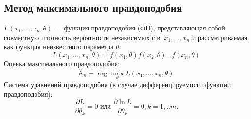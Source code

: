 \subsection{Метод максимального правдоподобия}
\begin{flushleft}
	$L(x_{1},... ,x_{n}, \theta)\,-$  функция правдоподобия (ФП), представляющая собой совместную плотность вероятности независимых с.в. $x_{1}, ... ,x_{n}$ и рассматриваемая как функция неизвестного параметра $\theta$:
	\begin{equation}
		L(x_{1},...,x_{n},\theta) = f(x_{1},\theta)f(x_{2},\theta)...f(x_{n}, \theta)
		\label{L()}
	\end{equation}
	Оценка максимального правдоподобия:
	\begin{equation}
		\hat{\theta}_{m} = \arg \max_{\theta}L(x_{1},...,x_{n},\theta)
		\label{theta_mp}
	\end{equation}
	Система уравнений правдоподобия (в случае дифференцируемости функции правдоподобия):
	\begin{equation}
		\frac{\partial L}{\partial \theta_{k}} = 0 \text{  или  } \frac{\partial \ln L}{\partial \theta_{k}} = 0, k = 1,..m.
	\end{equation}
\end{flushleft}

